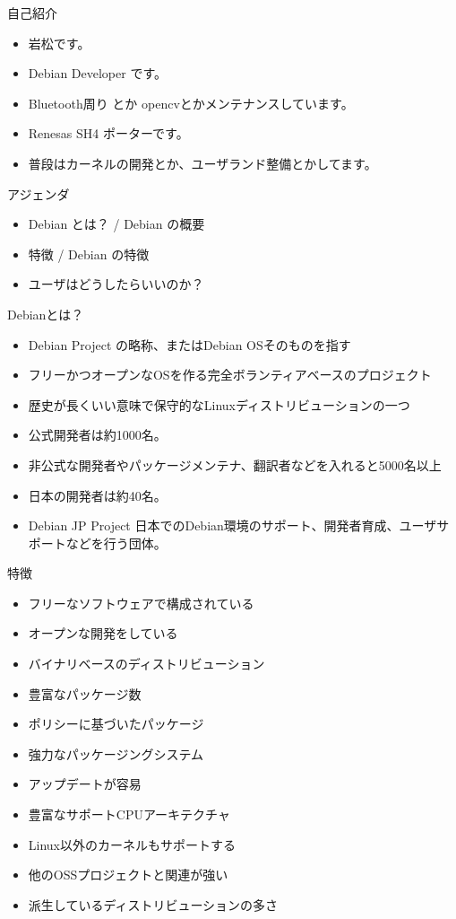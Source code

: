 \frame{\titlepage{}}


\begin{frame}{自己紹介}
  \begin{itemize}
  \item 岩松です。
  \item Debian Developer です。
  \item Bluetooth周り とか opencvとかメンテナンスしています。
  \item Renesas SH4 ポーターです。
  \item 普段はカーネルの開発とか、ユーザランド整備とかしてます。
  \end{itemize}
\end{frame}


\begin{frame}{アジェンダ}
  \begin{itemize}
  \item Debian とは？  / Debian の概要
  \item 特徴 / Debian の特徴
  \item ユーザはどうしたらいいのか？
  \end{itemize}
\end{frame}


\begin{frame}{Debianとは？}

\begin{itemize}
\item Debian Project の略称、またはDebian OSそのものを指す
\item フリーかつオープンなOSを作る完全ボランティアベースのプロジェクト
\item 歴史が長くいい意味で保守的なLinuxディストリビューションの一つ
\item 公式開発者は約1000名。
\item 非公式な開発者やパッケージメンテナ、翻訳者などを入れると5000名以上
\item 日本の開発者は約40名。
\item Debian JP Project
日本でのDebian環境のサポート、開発者育成、ユーザサポートなどを行う団体。
\end{itemize}
\end{frame}

\begin{frame}{特徴}
\begin{itemize}
\item フリーなソフトウェアで構成されている
\item オープンな開発をしている
\item バイナリベースのディストリビューション
\item 豊富なパッケージ数
\item ポリシーに基づいたパッケージ
\item 強力なパッケージングシステム
\item アップデートが容易
\item 豊富なサポートCPUアーキテクチャ
\item Linux以外のカーネルもサポートする
\item 他のOSSプロジェクトと関連が強い
\item 派生しているディストリビューションの多さ
\end{itemize}
\end{frame}


